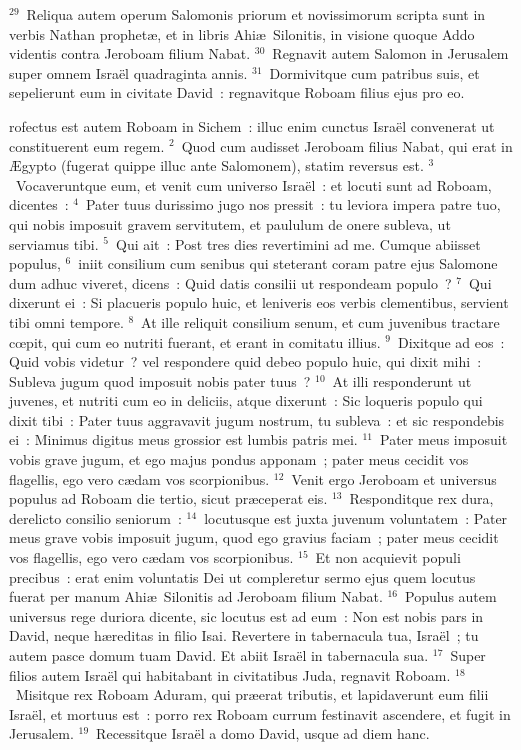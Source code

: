 ${}^{29}$~Reliqua autem operum Salomonis priorum et novissimorum scripta sunt in verbis Nathan prophet\ae , et in libris Ahi\ae\ Silonitis, in visione quoque Addo videntis contra Jeroboam filium Nabat.
${}^{30}$~Regnavit autem Salomon in Jerusalem super omnem Isra\"el quadraginta annis.
${}^{31}$~Dormivitque cum patribus suis, et sepelierunt eum in civitate David~: regnavitque Roboam filius ejus pro eo.

\bchapter
{}rofectus est autem Roboam in Sichem~: illuc enim cunctus Isra\"el convenerat ut constituerent eum regem.
${}^{2}$~Quod cum audisset Jeroboam filius Nabat, qui erat in \AE gypto (fugerat quippe illuc ante Salomonem), statim reversus est.
${}^{3}$~Vocaveruntque eum, et venit cum universo Isra\"el~: et locuti sunt ad Roboam, dicentes~:
${}^{4}$~Pater tuus durissimo jugo nos pressit~: tu leviora impera patre tuo, qui nobis imposuit gravem servitutem, et paululum de onere subleva, ut serviamus tibi.
${}^{5}$~Qui ait~: Post tres dies revertimini ad me. Cumque abiisset populus,
${}^{6}$~iniit consilium cum senibus qui steterant coram patre ejus Salomone dum adhuc viveret, dicens~: Quid datis consilii ut respondeam populo~?
${}^{7}$~Qui dixerunt ei~: Si placueris populo huic, et leniveris eos verbis clementibus, servient tibi omni tempore.
${}^{8}$~At ille reliquit consilium senum, et cum juvenibus tractare cœpit, qui cum eo nutriti fuerant, et erant in comitatu illius.
${}^{9}$~Dixitque ad eos~: Quid vobis videtur~? vel respondere quid debeo populo huic, qui dixit mihi~: Subleva jugum quod imposuit nobis pater tuus~?
${}^{10}$~At illi responderunt ut juvenes, et nutriti cum eo in deliciis, atque dixerunt~: Sic loqueris populo qui dixit tibi~: Pater tuus aggravavit jugum nostrum, tu subleva~: et sic respondebis ei~: Minimus digitus meus grossior est lumbis patris mei.
${}^{11}$~Pater meus imposuit vobis grave jugum, et ego majus pondus apponam~; pater meus cecidit vos flagellis, ego vero c\ae dam vos scorpionibus.
${}^{12}$~Venit ergo Jeroboam et universus populus ad Roboam die tertio, sicut pr\ae ceperat eis.
${}^{13}$~Responditque rex dura, derelicto consilio seniorum~:
${}^{14}$~locutusque est juxta juvenum voluntatem~: Pater meus grave vobis imposuit jugum, quod ego gravius faciam~; pater meus cecidit vos flagellis, ego vero c\ae dam vos scorpionibus.
${}^{15}$~Et non acquievit populi precibus~: erat enim voluntatis Dei ut compleretur sermo ejus quem locutus fuerat per manum Ahi\ae\ Silonitis ad Jeroboam filium Nabat.
${}^{16}$~Populus autem universus rege duriora dicente, sic locutus est ad eum~: Non est nobis pars in David, neque h\ae reditas in filio Isai. Revertere in tabernacula tua, Isra\"el~; tu autem pasce domum tuam David. Et abiit Isra\"el in tabernacula sua.
${}^{17}$~Super filios autem Isra\"el qui habitabant in civitatibus Juda, regnavit Roboam.
${}^{18}$~Misitque rex Roboam Aduram, qui pr\ae erat tributis, et lapidaverunt eum filii Isra\"el, et mortuus est~: porro rex Roboam currum festinavit ascendere, et fugit in Jerusalem.
${}^{19}$~Recessitque Isra\"el a domo David, usque ad diem hanc.

